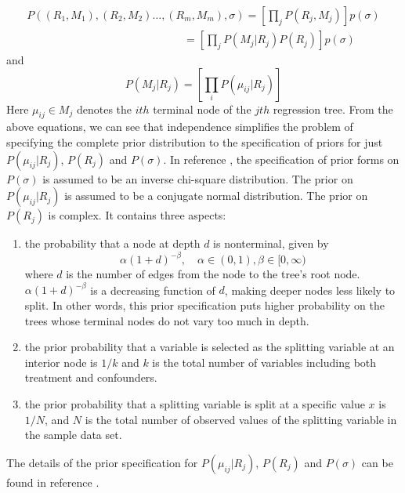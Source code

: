 \begin{equation*}
 \begin{array}{l}
P(({R_1},{M_1}),({R_2},{M_2}) \ldots ,({R_m},{M_m}),\sigma ) = \left[ {\prod\limits_j {P({R_j},{M_j})} } \right]p(\sigma )\\
\quad \quad \quad \quad \quad \quad \quad \quad \quad \quad \quad \quad \quad \quad \; = \left[ {\prod\limits_j {P({M_j}|{R_j})P({R_j})} } \right]p(\sigma )
\end{array}
 \end{equation*}
and
\begin{equation*}
P({M_j}|{R_j}) = \left[ {\prod\limits_i {P({\mu _{ij}}|{R_j})} } \right]
 \end{equation*}
Here ${\mu _{ij}} \in {M_j}$ denotes the $ith$ terminal node of the $jth$ regression tree. From the above equations, we can see that independence simplifies the problem of specifying the complete prior distribution to the specification of priors for just ${P({\mu _{ij}}|{R_j})}$, $P({R_j})$ and $P(\sigma)$. In reference \cite{chipman2010bart}, the specification of prior forms on $P(\sigma)$ is assumed to be an inverse chi-square distribution. The prior on ${P({\mu _{ij}}|{R_j})}$ is assumed to be a conjugate normal distribution. The prior on $P(R_j)$ is complex. It contains three aspects:
\begin{enumerate}
\item the probability that a node at depth $d$ is nonterminal, given by
\begin{equation*}
\alpha {(1 + d)^{ - \beta }},\quad \alpha  \in (0,1),\beta  \in [0,\infty )
 \end{equation*}
where $d$ is the number of edges from the node to the tree's root node. $\alpha {(1 + d)^{ - \beta }}$ is a decreasing function of $d$, making deeper nodes less likely to split. In other words, this prior specification puts higher probability on the trees whose terminal nodes do not vary too much in depth.
\item the prior probability that a variable is selected as the splitting variable at an interior node is $1/k$ and $k$ is the total number of variables including both treatment and confounders.
\item the prior probability that a splitting variable is split at a specific value $x$ is $1/N$, and $N$ is the total number of observed values of the splitting variable in the sample data set.
\end{enumerate}
The details of the prior specification for ${P({\mu _{ij}}|{R_j})}$, $P({R_j})$ and $P(\sigma)$ can be found in reference \cite{chipman2010bart}.


